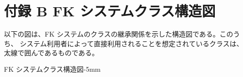 \chapter*{付録 B FK システムクラス構造図}
\setcounter{chapter}{2}
以下の図は、FK システムのクラスの継承関係を示した構造図である。このうち、
システム利用者によって直接利用されることを想定されているクラスは、
太線で囲んであるものである。

	{FK システムクラス構造図}{-5mm}
